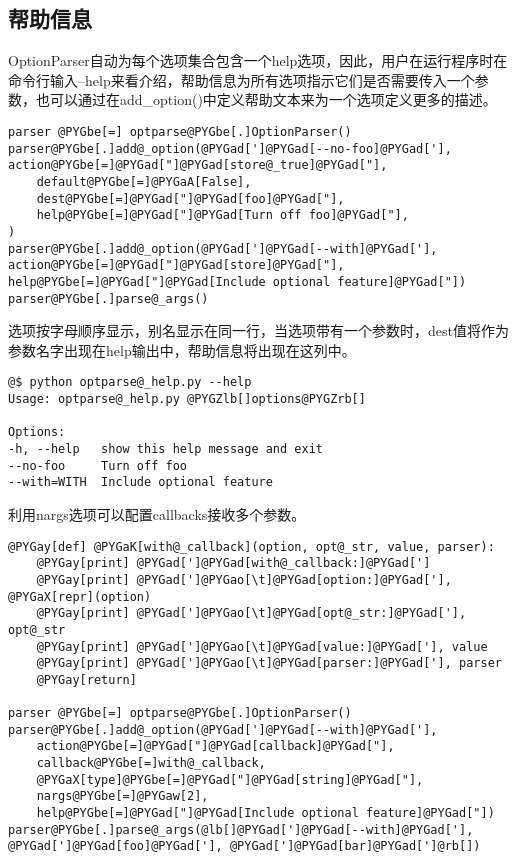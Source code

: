 \documentclass[a4paper,10pt,english]{manual}
\begin{document}
\subsection{帮助信息}

OptionParser自动为每个选项集合包含一个help选项，因此，用户在运行程序时在命令行输入--help来看介绍，帮助信息为所有选项指示它们是否需要传入一个参数，也可以通过在add\_option()中定义帮助文本来为一个选项定义更多的描述。

\begin{Verbatim}[commandchars=@\[\]]
parser @PYGbe[=] optparse@PYGbe[.]OptionParser()
parser@PYGbe[.]add@_option(@PYGad[']@PYGad[--no-foo]@PYGad['], action@PYGbe[=]@PYGad["]@PYGad[store@_true]@PYGad["],
    default@PYGbe[=]@PYGaA[False],
    dest@PYGbe[=]@PYGad["]@PYGad[foo]@PYGad["],
    help@PYGbe[=]@PYGad["]@PYGad[Turn off foo]@PYGad["],
)
parser@PYGbe[.]add@_option(@PYGad[']@PYGad[--with]@PYGad['], action@PYGbe[=]@PYGad["]@PYGad[store]@PYGad["], help@PYGbe[=]@PYGad["]@PYGad[Include optional feature]@PYGad["])
parser@PYGbe[.]parse@_args()
\end{Verbatim}

选项按字母顺序显示，别名显示在同一行，当选项带有一个参数时，dest值将作为参数名字出现在help输出中，帮助信息将出现在这列中。

\begin{Verbatim}[commandchars=@\[\]]
@$ python optparse@_help.py --help
Usage: optparse@_help.py @PYGZlb[]options@PYGZrb[]

Options:
-h, --help   show this help message and exit
--no-foo     Turn off foo
--with=WITH  Include optional feature
\end{Verbatim}

利用nargs选项可以配置callbacks接收多个参数。

\begin{Verbatim}[commandchars=@\[\]]
@PYGay[def] @PYGaK[with@_callback](option, opt@_str, value, parser):
    @PYGay[print] @PYGad[']@PYGad[with@_callback:]@PYGad[']
    @PYGay[print] @PYGad[']@PYGao[\t]@PYGad[option:]@PYGad['], @PYGaX[repr](option)
    @PYGay[print] @PYGad[']@PYGao[\t]@PYGad[opt@_str:]@PYGad['], opt@_str
    @PYGay[print] @PYGad[']@PYGao[\t]@PYGad[value:]@PYGad['], value
    @PYGay[print] @PYGad[']@PYGao[\t]@PYGad[parser:]@PYGad['], parser
    @PYGay[return]

parser @PYGbe[=] optparse@PYGbe[.]OptionParser()
parser@PYGbe[.]add@_option(@PYGad[']@PYGad[--with]@PYGad['],
    action@PYGbe[=]@PYGad["]@PYGad[callback]@PYGad["],
    callback@PYGbe[=]with@_callback,
    @PYGaX[type]@PYGbe[=]@PYGad["]@PYGad[string]@PYGad["],
    nargs@PYGbe[=]@PYGaw[2],
    help@PYGbe[=]@PYGad["]@PYGad[Include optional feature]@PYGad["])
parser@PYGbe[.]parse@_args(@lb[]@PYGad[']@PYGad[--with]@PYGad['], @PYGad[']@PYGad[foo]@PYGad['], @PYGad[']@PYGad[bar]@PYGad[']@rb[])
\end{Verbatim}
\end{document}
